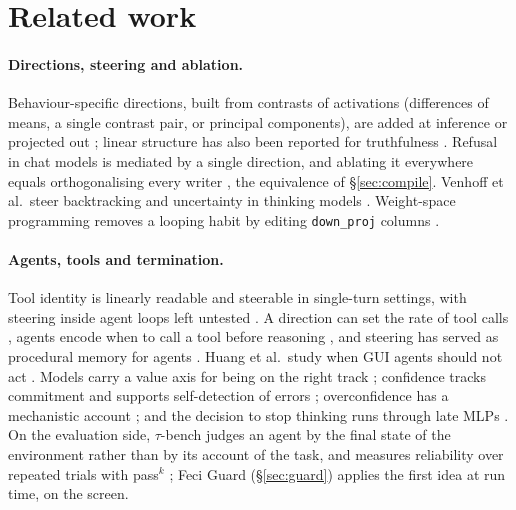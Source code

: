 \section{Related work}
\label{sec:related}

\paragraph{Directions, steering and ablation.} Behaviour-specific directions, built from contrasts of activations (differences of means, a single contrast pair, or principal components), are added at inference \citep{turner2023actadd,rimsky2023caa,zou2023repe,li2023iti} or projected out \citep{arditi2024refusal}; linear structure has also been reported for truthfulness \citep{marks2023geometry}. Refusal in chat models is mediated by a single direction, and ablating it everywhere equals orthogonalising every writer \citep{arditi2024refusal}, the equivalence of \S\ref{sec:compile}. Venhoff et al.\ steer backtracking and uncertainty in thinking models \citep{venhoff2025reasoning}. Weight-space programming removes a looping habit by editing \texttt{down\_proj} columns \citep{takehi2026wsp}.

\paragraph{Agents, tools and termination.} Tool identity is linearly readable and steerable in single-turn settings, with steering inside agent loops left untested \citep{wu2026toolcalling}. A direction can set the rate of tool calls \citep{chen2026toolrate}, agents encode when to call a tool before reasoning \citep{sun2026when2tool}, and steering has served as procedural memory for agents \citep{zhao2026npm}. Huang et al.\ study when GUI agents should not act \citep{huang2026conflict}. Models carry a value axis for being on the right track \citep{jiang2026value}; confidence tracks commitment \citep{kumaran2026commit} and supports self-detection of errors \citep{kumaran2026selfdetect}; overconfidence has a mechanistic account \citep{overconfidence2026}; and the decision to stop thinking runs through late MLPs \citep{dutta2026termination}. On the evaluation side, $\tau$-bench judges an agent by the final state of the environment rather than by its account of the task, and measures reliability over repeated trials with pass$^k$ \citep{yao2024taubench}; Feci Guard (\S\ref{sec:guard}) applies the first idea at run time, on the screen.

